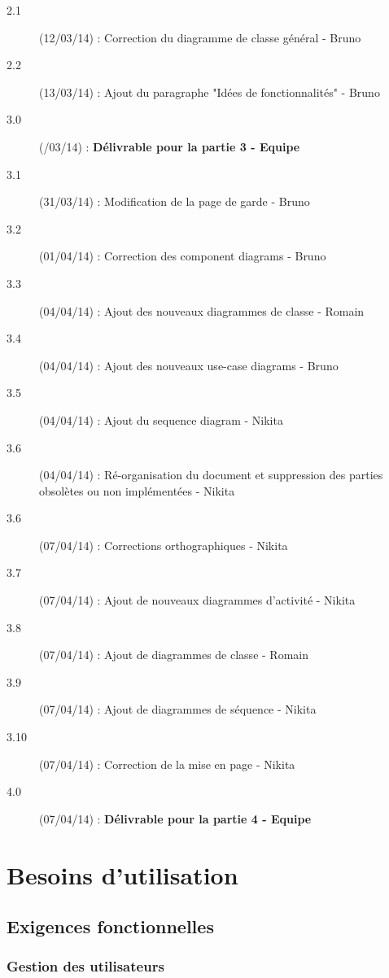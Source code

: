 \documentclass[a4paper]{report}
\begin{document}
\begin{description}
    \item[2.1] (12/03/14) : Correction du diagramme de classe général - Bruno
    \item[2.2] (13/03/14) : Ajout du paragraphe "Idées de fonctionnalités" - Bruno
    \item[3.0] (/03/14) : \textbf{Délivrable pour la partie 3 - Equipe}
    
    \item[3.1] (31/03/14) : Modification de la page de garde - Bruno
    \item[3.2] (01/04/14) : Correction des component diagrams - Bruno
    \item[3.3] (04/04/14) : Ajout des nouveaux diagrammes de classe - Romain
    \item[3.4] (04/04/14) : Ajout des nouveaux use-case diagrams - Bruno
    \item[3.5] (04/04/14) : Ajout du sequence diagram - Nikita
    \item[3.6] (04/04/14) : Ré-organisation du document et suppression des parties obsolètes ou non implémentées - Nikita
	\item[3.6] (07/04/14) : Corrections orthographiques - Nikita
	\item[3.7] (07/04/14) : Ajout de nouveaux diagrammes d'activité - Nikita
	\item[3.8] (07/04/14) : Ajout de diagrammes de classe - Romain
	\item[3.9] (07/04/14) : Ajout de diagrammes de séquence - Nikita
	\item[3.10] (07/04/14) : Correction de la mise en page - Nikita
    
    \item[4.0] (07/04/14) : \textbf{Délivrable pour la partie 4 - Equipe}
    


\end{description}


\chapter{Besoins d'utilisation}
\section{Exigences fonctionnelles}

\subsection{Gestion des utilisateurs}
\end{document}
